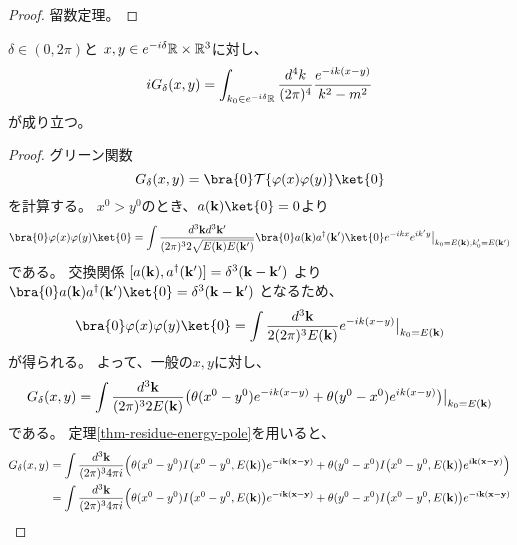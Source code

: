 \begin{proof}
留数定理。
\end{proof}

\begin{thm}
  $\delta \in (0,2\pi)$と
  $x,y \in e^{-i\delta}\mathbb{R} \times \mathbb{R}^3$に対し、
  \begin{equation}
  iG_\delta(x,y)=
  \int_{k_0\in e^{-i\delta}\mathbb{R}}
  \frac{d^4k}{(2\pi)^4}
  \frac{e^{-ik(x-y)}}{k^2-m^2}
  \end{equation}
  が成り立つ。
\end{thm}

\begin{proof}
  グリーン関数
  \begin{equation}
    G_\delta(x,y)=\bra{0}\calT\{\varphi(x)\varphi(y)\}\ket{0}
  \end{equation}
  を計算する。
  $x^0>y^0$のとき、$a(\bfk)\ket{0}=0$より
  \begin{equation}
    \bra{0}\varphi(x)\varphi(y)\ket{0}=
    \int \frac{d^3\bfk d^3\bfk'}{(2\pi)^3 2\sqrt{E(\bfk)E(\bfk')}}
    \bra{0}a(\bfk)a^\dagger(\bfk')\ket{0}
    \bigl.e^{-ikx}e^{ik'y}\bigr|_{k_0=E(\bfk),k'_0=E(\bfk')}
  \end{equation}
  である。
  交換関係
  $[a(\mathbf{k}),a^\dagger(\mathbf{k}')]=\delta^3(\mathbf{k}-\mathbf{k}')$
  より$\bra{0}a(\bfk)a^\dagger(\bfk')\ket{0}=\delta^3(\bfk-\bfk')$
  となるため、
  \begin{equation}
    \bra{0}\varphi(x)\varphi(y)\ket{0}=
    \int \frac{d^3\bfk}{2(2\pi)^3E(\bfk)}
    e^{-ik(x-y)}\bigr|_{k_0=E(\bfk)}
  \end{equation}
  が得られる。
  よって、一般の$x,y$に対し、
  \begin{equation}
    G_\delta(x,y)=
    \int \frac{d^3\mathbf{k}}{(2\pi)^3 2E(\mathbf{k})}
    \bigl.
    \bigl(
    \theta(x^0-y^0)
    e^{-ik(x-y)}
    +
    \theta(y^0-x^0)
    e^{ik(x-y)}
    \bigr)
    \bigr|_{k_0=E(\mathbf{k})}
  \end{equation}
  である。
  定理\ref{thm-residue-energy-pole}を用いると、
  \begin{align*}
    G_\delta(x,y) &=
    \int \frac{d^3\bfk}{(2\pi)^3 4\pi i}
    \Bigl(
    \theta(x^0-y^0)
    I\bigl(x^0-y^0,E(\bfk)\bigr)
    e^{-i\bfk(\bfx-\bfy)}
    +
    \theta(y^0-x^0)
    I\bigl(x^0-y^0,E(\bfk)\bigr)
    e^{i\bfk(\bfx-\bfy)}
    \Bigr) \\  &=
    \int \frac{d^3\bfk}{(2\pi)^3 4\pi i}
    \Bigl(
    \theta(x^0-y^0)
    I\bigl(x^0-y^0,E(\bfk)\bigr)
    e^{-i\bfk(\bfx-\bfy)}
    +
    \theta(y^0-x^0)
    I\bigl(x^0-y^0,E(\bfk)\bigr)
    e^{-i\bfk(\bfx-\bfy)}

\end{align*}
\end{proof}
